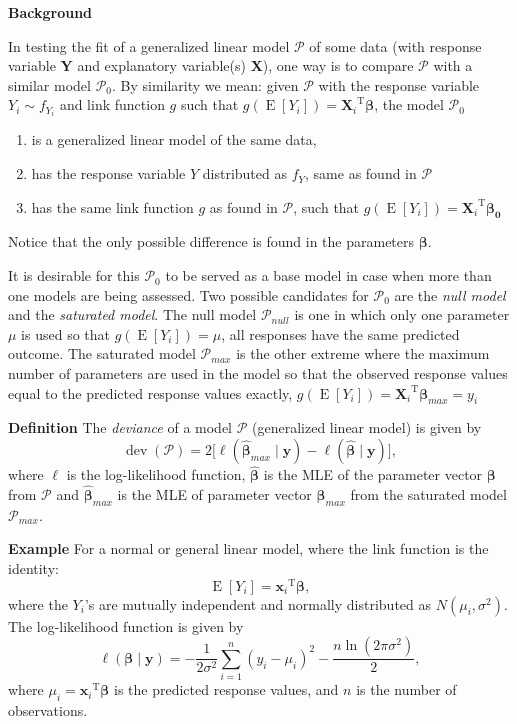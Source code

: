 \documentclass[12pt]{article}
\begin{document}
\textbf{Background}

In testing the fit of a generalized linear model $\mathcal{P}$ of some data (with response variable \textbf{Y} and explanatory variable(s) \textbf{X}), one way is to compare $\mathcal{P}$ with a similar model $\mathcal{P}_0$.  By similarity we mean: given $\mathcal{P}$ with the response variable $Y_i\sim f_{Y_i}$ and link function $g$ such that $g(\operatorname{E}[Y_i])={\textbf{X}_i}^{\operatorname{T}}\boldsymbol{\beta}$, the model $\mathcal{P}_0$
\begin{enumerate}
\item is a generalized linear model of the same data,
\item has the response variable $Y$ distributed as $f_Y$, same as found in $\mathcal{P}$
\item has the same link function $g$ as found in $\mathcal{P}$, such that $g(\operatorname{E}[Y_i])={\textbf{X}_i}^{\operatorname{T}}\boldsymbol{\beta_0}$
\end{enumerate}
Notice that the only possible difference is found in the parameters $\boldsymbol{\beta}$.  

It is desirable for this $\mathcal{P}_0$ to be served as a base model in case when more than one models are being assessed.  Two possible candidates for $\mathcal{P}_0$ are the \emph{null model} and the \emph{saturated model}.  The null model $\mathcal{P}_{null}$ is one in which only one parameter $\mu$ is used so that $g(\operatorname{E}[Y_i])=\mu$, all responses have the same predicted outcome.  The saturated model $\mathcal{P}_{max}$ is the other extreme where the maximum number of parameters are used in the model so that the observed response values equal to the predicted response values exactly, $g(\operatorname{E}[Y_i])={\textbf{X}_i}^{\operatorname{T}}\boldsymbol{\beta}_{max}=y_i$

\textbf{Definition}
The \emph{deviance} of a model $\mathcal{P}$ (generalized linear model) is given by
$$\operatorname{dev}(\mathcal{P})=2\big[\ell(\hat{\boldsymbol{\beta}}_{max}\mid\textbf{y})-\ell(\hat{\boldsymbol{\beta}}\mid\textbf{y})\big],$$
where $\ell$ is the log-likelihood function, $\hat{\boldsymbol{\beta}}$ is the MLE of the parameter vector $\boldsymbol{\beta}$ from $\mathcal{P}$ and $\hat{\boldsymbol{\beta}}_{max}$ is the MLE of parameter vector $\boldsymbol{\beta}_{max}$ from the saturated model $\mathcal{P}_{max}$.

\textbf{Example}
For a normal or general linear model, where the link function is the identity: 
$$\operatorname{E}[Y_i]={\textbf{x}_i}^{\operatorname{T}}\boldsymbol{\beta},$$
where the $Y_i$'s are mutually independent and normally distributed as $N(\mu_i,\sigma^2)$.  The log-likelihood function is given by
$$\ell(\boldsymbol{\beta}\mid\textbf{y})=-\frac{1}{2\sigma^2}\sum_{i=1}^{n}(y_i-\mu_i)^2-\frac{n\operatorname{ln}(2\pi\sigma^2)}{2},$$
where $\mu_i={\textbf{x}_i}^{\operatorname{T}}\boldsymbol{\beta}$ is the predicted response values, and $n$ is the number of observations.
\end{document}
